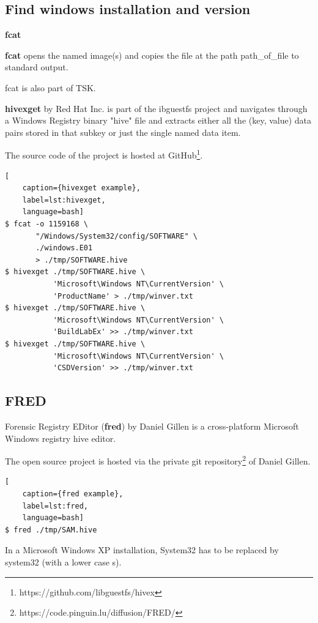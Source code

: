 \subsection{Find windows installation and version}

\textbf{fcat}

\textbf{fcat} opens the named image(s) and copies the file at the path path\_of\_file to standard output.

fcat is also part of TSK.

\textbf{hivexget} by Red Hat Inc. is part of the ibguestfs project and navigates through a Windows Registry binary "hive" file and extracts either all the (key, value) data pairs stored in that subkey or just the single named data item.

The source code of the project is hosted at GitHub\footnote{https://github.com/libguestfs/hivex}.

\begin{lstlisting}[
    caption={hivexget example},
    label=lst:hivexget,
    language=bash]
$ fcat -o 1159168 \
       "/Windows/System32/config/SOFTWARE" \
       ./windows.E01
       > ./tmp/SOFTWARE.hive
$ hivexget ./tmp/SOFTWARE.hive \
           'Microsoft\Windows NT\CurrentVersion' \
           'ProductName' > ./tmp/winver.txt
$ hivexget ./tmp/SOFTWARE.hive \
           'Microsoft\Windows NT\CurrentVersion' \
           'BuildLabEx' >> ./tmp/winver.txt
$ hivexget ./tmp/SOFTWARE.hive \
           'Microsoft\Windows NT\CurrentVersion' \
           'CSDVersion' >> ./tmp/winver.txt
\end{lstlisting}

\subsection{FRED}

Forensic Registry EDitor (\textbf{fred}) by Daniel Gillen is a cross-platform Microsoft Windows registry hive editor.

The open source project is hosted via the private git repository\footnote{https://code.pinguin.lu/diffusion/FRED/} of Daniel Gillen.

\begin{lstlisting}[
    caption={fred example},
    label=lst:fred,
    language=bash]
$ fred ./tmp/SAM.hive
\end{lstlisting}

In a Microsoft Windows XP installation, System32 has to be replaced by system32 (with a lower case s).


